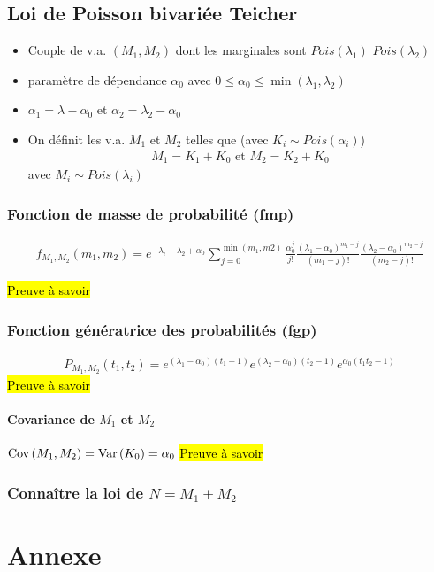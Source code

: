 \documentclass[10pt, french]{article}
\begin{document}
\begin{multicols*}{2}
\subsection{Loi de Poisson bivariée Teicher}
\begin{itemize}
\item Couple de v.a. $(M_1, M_2)$ dont les marginales sont $Pois(\lambda_1)$ $Pois(\lambda_2)$
\item paramètre de dépendance $\alpha_0$ avec $0 \leq \alpha_0 \leq \min(\lambda_1, \lambda_2)$
\item $\alpha_1 = \lambda - \alpha_0$ et $\alpha_2 = \lambda_2 - \alpha_0$
\item On définit les v.a. $M_1$ et $M_2$ telles que (avec $K_i \sim Pois(\alpha_i)$)
\begin{align*}
M_1 = K_1 + K_0 \text{ et } M_2 = K_2 + K_0
\end{align*}
avec $M_i \sim Pois(\lambda_i)$
\end{itemize}

\subsubsection{Fonction de masse de probabilité (fmp)}

\begin{align*}
f_{M_1, M_2}(m_1, m_2) = e^{-\lambda_i - \lambda_2 + \alpha_0} \sum_{j=0}^{\min(m_1, m2)} \frac{\alpha_0^{j}}{j!} \frac{(\lambda_1 - \alpha_0)^{m_1 - j}}{(m_1 - j)!} \frac{(\lambda_2 - \alpha_0)^{m_2 - j}}{(m_2 - j)!}
\end{align*}



\hl{Preuve à savoir}

\subsubsection{Fonction génératrice des probabilités (fgp)}
\begin{align*}
P_{M_1, M_2}(t_1, t_2) = e^{(\lambda_1 - \alpha_0)(t_1 -1)} e^{(\lambda_2 - \alpha_0)(t_2 - 1)} e^{\alpha_0(t_1 t_2 - 1)}
\end{align*}
\hl{Preuve à savoir}

\paragraph{Covariance de $M_1$ et $M_2$} $\mathrm{Cov} \left( M_1, M_2 \right) = \mathrm{Var} \left( K_0 \right) = \alpha_0$
\hl{Preuve à savoir}

\subsubsection{Connaître la loi de $N = M_1 + M_2$}



\newpage
\section{Annexe}


\end{multicols*}




\end{document}
